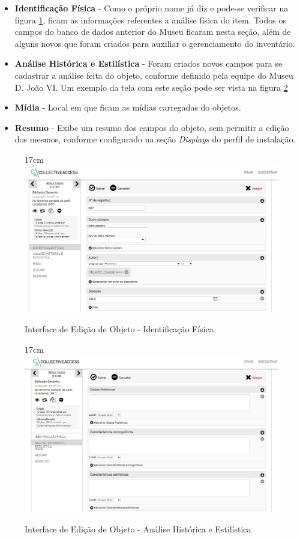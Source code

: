 \documentclass[a4paper,12pt,oneside,onecolumn,final,fleqn]{repUERJ}
\begin{document}
\begin{itemize}
	\item \textbf{Identificação Física} - Como o próprio nome já diz e pode-se verificar na figura \ref{fig:tela_id_fis},  ficam as informações referentes a análise física do item. Todos os campos do banco de dados anterior do Museu ficaram nesta seção, além de alguns novos que foram criados para auxiliar o gerenciamento do inventário.
	\item \textbf{Análise Histórica e Estilística} - Foram criados novos campos para se cadastrar a análise feita do objeto, conforme definido pela equipe do Museu D. João VI. Um exemplo da tela com este seção pode ser vista na figura \ref{fig:Tela_hist} 
	\item \textbf{Mídia} - Local em que ficam as mídias carregadas do objetos.
	\item \textbf{Resumo} - Exibe um resumo dos campos do objeto, sem permitir a edição dos mesmos, conforme configurado na seção \textit{Displays} do perfil de instalação.
\end{itemize}

\begin{figure}[!ht]{17cm}
	\includegraphics[width=15cm, center]{figuras/tela_id_fis.jpg}
	\caption{Interface de Edição de Objeto - Identificação Física} \label{fig:tela_id_fis}
\end{figure}

\begin{figure}[!ht]{17cm}
	\includegraphics[width=15cm, center]{figuras/Tela_hist.jpg}
	\caption{Interface de Edição de Objeto - Análise Histórica e Estilística} \label{fig:Tela_hist}
\end{figure}
\end{document}
